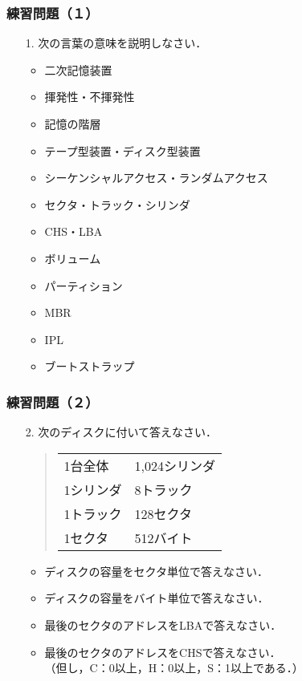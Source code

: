 \documentclass[unicode]{beamer}                   %
\begin{document}
\begin{frame}
  \frametitle{練習問題（１）}
  \begin{enumerate}
  \item[1.] 次の言葉の意味を説明しなさい．
    \begin{itemize}
    \item 二次記憶装置
    \item 揮発性・不揮発性
    \item 記憶の階層
    \item テープ型装置・ディスク型装置
    \item シーケンシャルアクセス・ランダムアクセス
    \item セクタ・トラック・シリンダ
    \item CHS・LBA
    \item ボリューム
    \item パーティション
    \item MBR
    \item IPL
    \item ブートストラップ
    \end{itemize}
  \end{enumerate}
\end{frame}

\begin{frame}
  \frametitle{練習問題（２）}
  \begin{enumerate}
  \item[2.] 次のディスクに付いて答えなさい．
    \begin{quote}
      \begin{tabular}{l l}
        1台全体   & 1,024シリンダ  \\
        1シリンダ & 8トラック      \\
        1トラック & 128セクタ      \\
        1セクタ   & 512バイト
      \end{tabular}
    \end{quote}
    \begin{itemize}
    \item ディスクの容量をセクタ単位で答えなさい．
    \item ディスクの容量をバイト単位で答えなさい．
    \item 最後のセクタのアドレスをLBAで答えなさい．
    \item 最後のセクタのアドレスをCHSで答えなさい．\\
      （但し，C：0以上，H：0以上，S：1以上である．）
    \end{itemize}
  \end{enumerate}
\end{frame}
\end{document}
